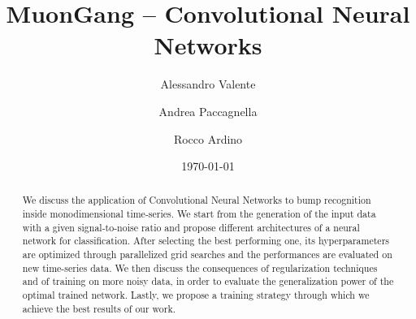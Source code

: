 \documentclass[prl,twocolumn]{revtex4-1}
\begin{document}
\title{MuonGang -- Convolutional Neural Networks}

\author{Alessandro Valente}
\author{Andrea Paccagnella}
\author{Rocco Ardino}

\date{\today}





\begin{abstract}
We discuss the application of Convolutional Neural Networks to bump recognition inside monodimensional time-series. We start from the generation of the input data with a given signal-to-noise ratio and propose different architectures of a neural network for classification. After selecting the best performing one, its hyperparameters are optimized through parallelized grid searches and the performances are evaluated on new time-series data. We then discuss the consequences of regularization techniques and of training on more noisy data, in order to evaluate the generalization power of the optimal trained network. Lastly, we propose a training strategy through which we achieve the best results of our work.
\end{abstract}

\maketitle
\end{document}
